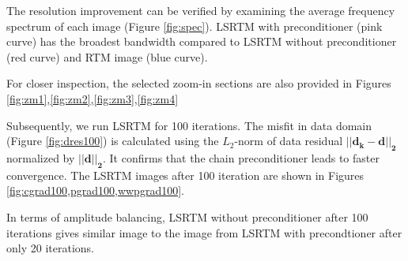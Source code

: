 
%

The resolution improvement can be verified by examining the average frequency spectrum of each image (Figure \ref{fig:spec}). LSRTM with preconditioner (pink curve) has the broadest bandwidth compared to LSRTM without preconditioner (red curve) and RTM image (blue curve). 



%

For closer inspection, the selected zoom-in sections are also provided in Figures \ref{fig:zm1},\ref{fig:zm2},\ref{fig:zm3},\ref{fig:zm4}


%

Subsequently, we run LSRTM for 100 iterations. The misfit in data domain (Figure \ref{fig:dres100}) is calculated using the $L_2$-norm of data residual $\mathbf{|| d_k - d ||_{2}}$ normalized by $\mathbf{||d ||_{2}}$. It confirms that the chain preconditioner leads to faster convergence. The LSRTM images after 100 iteration are shown in Figures \ref{fig:cgrad100,pgrad100,wwpgrad100}. 





In terms of amplitude balancing, LSRTM without preconditioner after 100 iterations gives similar image to the image from LSRTM with precondtioner after only 20 iterations.
